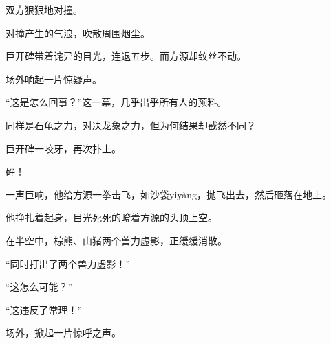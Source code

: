 \begin{this_body}
双方狠狠地对撞。

对撞产生的气浪，吹散周围烟尘。

巨开碑带着诧异的目光，连退五步。而方源却纹丝不动。

场外响起一片惊疑声。

“这是怎么回事？”这一幕，几乎出乎所有人的预料。

同样是石龟之力，对决龙象之力，但为何结果却截然不同？

巨开碑一咬牙，再次扑上。

砰！

一声巨响，他给方源一拳击飞，如沙袋yiyàng，抛飞出去，然后砸落在地上。

他挣扎着起身，目光死死的瞪着方源的头顶上空。

在半空中，棕熊、山猪两个兽力虚影，正缓缓消散。

“同时打出了两个兽力虚影！”

“这怎么可能？”

“这违反了常理！”

场外，掀起一片惊呼之声。

\end{this_body}


